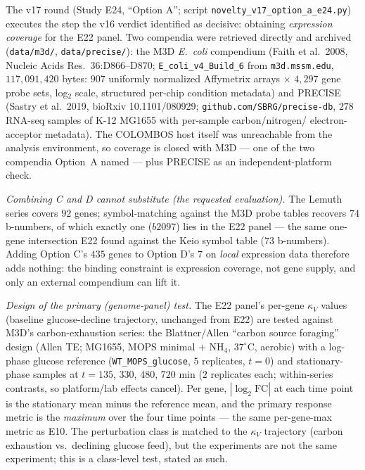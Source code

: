 \documentclass[11pt,a4paper]{article}
\theoremstyle{plain}
\theoremstyle{definition}
\theoremstyle{remark}
\begin{document}
The v17 round (Study E24, ``Option A''; script
\texttt{novelty\_v17\_option\_a\_e24.py}) executes the step the v16
verdict identified as decisive: obtaining \emph{expression coverage}
for the E22 panel. Two compendia were retrieved directly and archived
(\texttt{data/m3d/}, \texttt{data/precise/}): the M3D \emph{E.~coli}
compendium (Faith et al.\ 2008, Nucleic Acids Res.\ 36:D866--D870;
\texttt{E\_coli\_v4\_Build\_6} from \texttt{m3d.mssm.edu},
$117{,}091{,}420$ bytes: $907$ uniformly normalized Affymetrix arrays
$\times$ $4{,}297$ gene probe sets, log$_2$ scale, structured
per-chip condition metadata) and PRECISE (Sastry et al.\ 2019,
bioRxiv 10.1101/080929; \texttt{github.com/SBRG/precise-db}, $278$
RNA-seq samples of K-12 MG1655 with per-sample carbon/nitrogen/
electron-acceptor metadata). The COLOMBOS host itself was unreachable
from the analysis environment, so coverage is closed with M3D --- one
of the two compendia Option~A named --- plus PRECISE as an
independent-platform check.

\emph{Combining C and D cannot substitute (the requested
evaluation).} The Lemuth series covers $92$ genes; symbol-matching
against the M3D probe tables recovers $74$ b-numbers, of which
exactly one ($b2097$) lies in the E22 panel --- the same
one-gene intersection E22 found against the Keio symbol table
($73$ b-numbers). Adding Option C's $435$ genes to Option D's $7$
on \emph{local} expression data therefore adds nothing: the binding
constraint is expression coverage, not gene supply, and only an
external compendium can lift it.

\emph{Design of the primary (genome-panel) test.} The E22 panel's
per-gene $\kappa_V$ values (baseline glucose-decline trajectory,
unchanged from E22) are tested against M3D's carbon-exhaustion
series: the Blattner/Allen ``carbon source foraging'' design (Allen
TE; MG1655, MOPS minimal $+$ NH$_4$, $37^{\circ}$C, aerobic) with a
log-phase glucose reference (\texttt{WT\_MOPS\_glucose}, $5$
replicates, $t=0$) and stationary-phase samples at $t = 135$, $330$,
$480$, $720$ min ($2$ replicates each; within-series contrasts, so
platform/lab effects cancel). Per gene, $|\log_2\mathrm{FC}|$ at each
time point is the stationary mean minus the reference mean, and the
primary response metric is the \emph{maximum} over the four time
points --- the same per-gene-max metric as E10. The perturbation
class is matched to the $\kappa_V$ trajectory (carbon exhaustion vs.\
declining glucose feed), but the experiments are not the same
experiment; this is a class-level test, stated as such.
\end{document}
